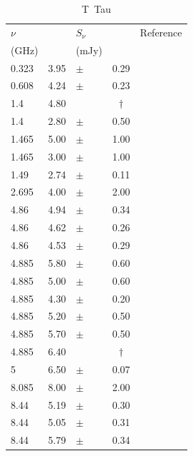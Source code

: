\documentclass[9pt]{extarticle}   	%
\def\multic#1#2{\multicolumn{#1}{c}{#2}}
\def\dagmark{\multic{1}{$\dag$\qquad}}
\begin{document}
\begin{table}
\caption{T~Tau}
\begin{center}
\begin{tabular}{lllll}
\hline
 $\nu$ & & $S_\nu$ & & Reference\\
 (GHz) & & (mJy) & & \\
\hline
 0.323  &     3.95 & $\pm$ & 0.29  & \citet{2016MNRAS.459.1248A} \\
 0.608  &     4.24 & $\pm$ & 0.23  & \citet{2016MNRAS.459.1248A} \\
 1.4    &     4.80 &    & \dagmark & \citet{1998AJ....115.1693C}\\
 1.4    &     2.80 & $\pm$ & 0.50  & \citet{1986ApJ...303..233S}\\
 1.465  &     5.00 & $\pm$ & 1.00  & \citet{1983RMxAA...8..163R}\\
 1.465  &     3.00 & $\pm$ & 1.00  & \citet{1984ApJ...280L..23S}\\
 1.49   &     2.74 & $\pm$ & 0.11  & \citet{1986AJ.....92.1396C}\\
 2.695  &     4.00 & $\pm$ & 2.00  & \citet{1974ApJ...188L.105S}\\
 4.86   &     4.94 & $\pm$ & 0.34  & \citet{1994AJ....107.1461S}\\
 4.86   &     4.62 & $\pm$ & 0.26  & \citet{1994AJ....107.1461S}\\
 4.86   &     4.53 & $\pm$ & 0.29  & \citet{1994AJ....107.1461S}\\
 4.885  &     5.80 & $\pm$ & 0.60  & \citet{1982ApJ...253..707C}\\
 4.885  &     5.00 & $\pm$ & 0.60  & \citet{1983RMxAA...8..163R}\\
 4.885  &     4.30 & $\pm$ & 0.20  & \citet{1984ApJ...280L..23S}\\
 4.885  &     5.20 & $\pm$ & 0.50  & \citet{1984ApJ...282..699B}\\
 4.885  &     5.70 & $\pm$ & 0.50  & \citet{1986ApJ...303..233S}\\
 4.885  &     6.40 &    & \dagmark & \citet{1987ApJ...320..364E}\\
 5      &     6.50 & $\pm$ & 0.07  & \citet{1982ApJ...253..707C}\\
 8.085  &     8.00 & $\pm$ & 2.00  & \citet{1974ApJ...188L.105S}\\
 8.44   &     5.19 & $\pm$ & 0.30  & \citet{1994AJ....107.1461S}\\
 8.44   &     5.05 & $\pm$ & 0.31  & \citet{1994AJ....107.1461S}\\
 8.44   &     5.79 & $\pm$ & 0.34  & \citet{1994AJ....107.1461S}\\

\end{tabular}
\end{center}
\end{table}
\end{document}

